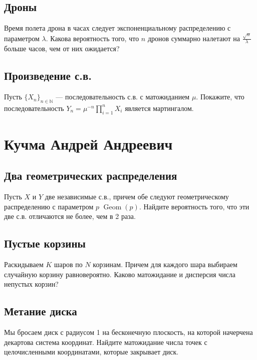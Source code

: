 \documentclass[12pt]{article}
\newcommand\N{\mathbb{N}}
\DeclareMathOperator{\Geom}{Geom}
\begin{document}
\subsection{Дроны}

Время полета дрона в часах следует экспоненциальному распределению с параметром $\lambda$. Какова вероятность того, что $n$ дронов суммарно налетают на $\frac{\sqrt{n}}{\lambda}$ больше часов, чем от них ожидается?



\subsection{Произведение с.в.}

Пусть $\{X_n\}_{n \in \N}$ --- последовательность с.в. с матожиданием $\mu$. Покажите, что последовательность $Y_n = \mu^{-n} \prod_{i = 1}^n X_i$ является мартингалом.



\newpage
\section{Кучма Андрей Андреевич}

\subsection{Два геометрических распределения}

Пусть $X$ и $Y$ две независимые с.в., причем обе следуют геометрическому распределению с параметром $p$ $\Geom(p)$. Найдите вероятность того, что эти две с.в. отличаются не более, чем в 2 раза.



\subsection{Пустые корзины}

Раскидываем $K$ шаров по $N$ корзинам. Причем для каждого шара выбираем случайную корзину равновероятно. Каково матожидание и дисперсия числа непустых корзин?



\subsection{Метание диска}

Мы бросаем диск с радиусом 1 на бесконечную плоскость, на которой начерчена декартова система координат. Найдите матожидание числа точек с целочисленными координатами, которые закрывает диск.
\end{document}
